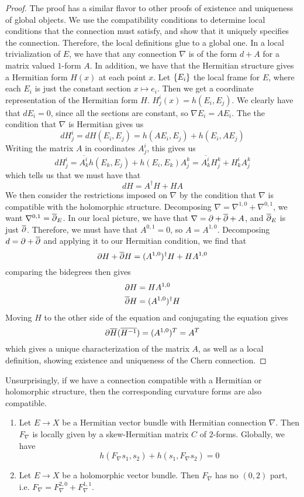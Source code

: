 \begin{proof}
The proof has a similar flavor to other proofs of existence and uniqueness of global
objects. We use the compatibility conditions to determine local conditions that
the connection must satisfy, and show that it uniquely specifies the connection.
Therefore, the local definitions glue to a global one. In a local trivialization
of $E$, we have that any connection $\nabla$ is of the form $d + A$ for a matrix
valued $1$-form $A$. In addition, we have that the Hermitian structure gives a
Hermitian form $H(x)$ at each point $x$. Let $\left\lbrace E_i \right\rbrace$ the local
frame for $E$, where each $E_i$ is just the constant section $x \mapsto e_i$. Then we
get a coordinate representation of the Hermitian form $H$.
$H^i_j(x) = h(E_i,E_j)$. We clearly have that $dE_i = 0$, since all the sections
are constant, so $\nabla E_i = AE_i$. The the condition that $\nabla$ is Hermitian gives
us
\[
dH^i_j  = dH(E_i,E_j) = h(AE_i, E_j) + h(E_i, AE_j)
\]
Writing the matrix $A$ in coordinates $A^i_j$, this gives us
\[
dH^i_j = \overline{A^i_k}h(E_k, E_j) + h(E_i, E_k)A^k_j
= \overline{A^i_k}H^k_j + H^i_kA^k_j
\]
which tells us that we must have that
\[
dH = A^\dagger H + HA
\]
We then consider the restrictions imposed on $\nabla$ by the condition that
$\nabla$ is compatible with the holomorphic structure. Decomposing
$\nabla = \nabla^{1,0} + \nabla^{0,1}$, we want $\nabla^{0,1} = \overline{\partial}_E$. In our local
picture, we have that $\nabla = \partial + \overline{\partial} + A$, and $\overline{\partial}_E$ is just $\overline{\partial}$.
Therefore, we must have that $A^{0,1} = 0$, so $A = A^{1,0}$. Decomposing
$d = \partial + \overline{\partial}$ and applying it to our Hermitian condition, we find that
\[
\partial H + \overline{\partial} H = (A^{1,0})^\dagger H + HA^{1,0}
\]
comparing the bidegrees then gives
\begin{align*}
\partial H &= HA^{1,0}\\
\overline{\partial} H &= (A^{1,0})^\dagger H
\end{align*}
Moving $H$ to the other side of the equation and conjugating the equation gives
\[
\partial\overline{H} (\overline{H^{-1}}) = (A^{1,0})^T = A^T
\]
which gives a unique characterization of the matrix $A$, as well as a local definition,
showing existence and uniqueness of the Chern connection.
\end{proof}
%
Unsurprisingly, if we have a connection compatible with a Hermitian or holomorphic
structure, then the corresponding curvature forms are also compatible.
%
\begin{prop} \enumbreak
\begin{enumerate}
  \item Let $E \to X$ be a Hermitian vector bundle with Hermitian connection $\nabla$.
  Then $F_\nabla$ is locally given by a skew-Hermitian matrix $C$ of $2$-forms.
  Globally, we have
  \[
  h(F_\nabla s_1, s_2) + h(s_1, F_\nabla s_2) = 0
  \]
  \item Let $E \to X$ be a holomorphic vector bundle. Then $F_\nabla$ has
  no $(0,2)$ part, i.e. $F_\nabla = F^{2,0}_\nabla + F^{1,1}_\nabla$.
\end{enumerate}
\end{prop}
